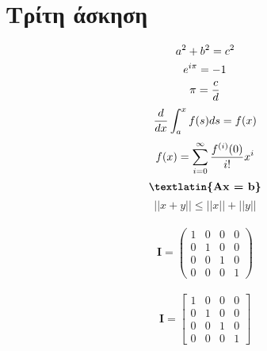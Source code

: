 \documentclass{article}
\begin{document}
\section{Τρίτη άσκηση}
\begin{equation*}
a^2 + b^2 = c^2 \\
\end{equation*}
\begin{equation*}
e^{i\pi} = -1 \\
\end{equation*}
\begin{equation*}
\pi = \frac{c}{d} \\
\end{equation*}
\begin{equation*}
\frac{d}{dx} \int_{a}^{x} f(s)ds=f(x) \\
\end{equation*}
\begin{equation*}
f(x) = \sum_{i=0}^{\infty} \frac{f^{(i)}(0)}{i!}x^i \\ 
\end{equation*}
\begin{equation*}
\textbf{\textlatin{Ax = b}} \\
\end{equation*}
\begin{equation*}
||x+y|| \leq ||x|| + ||y||
\end{equation*} \\
\begin{equation}
    \textbf{I}=\begin{pmatrix}
    1&0&0&0 \\
    0&1&0&0 \\
    0&0&1&0 \\
    0&0&0&1
    \end{pmatrix}
\end{equation} \\
\begin{equation}
    \textbf{I}=\begin{bmatrix}
    1&0&0&0 \\
    0&1&0&0 \\
    0&0&1&0 \\
    0&0&0&1
    \end{bmatrix}
\end{equation} \\
\end{document}
